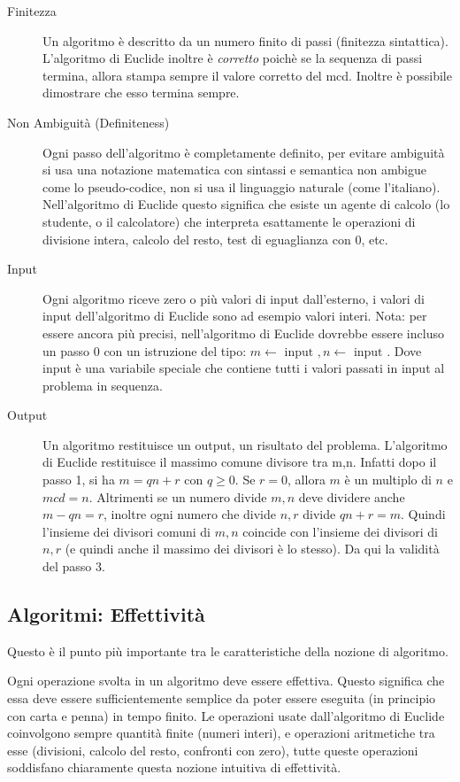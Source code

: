 \begin{description}
\item[Finitezza] Un algoritmo è descritto da un numero finito di passi (finitezza sintattica).  L'algoritmo di Euclide inoltre è \emph{corretto} poichè se la sequenza di passi termina, allora stampa sempre il valore corretto del mcd. Inoltre è possibile dimostrare che esso termina sempre.
\item[Non Ambiguità (Definiteness)] Ogni passo dell'algoritmo è completamente definito, per evitare ambiguità si usa una notazione matematica con sintassi e semantica non ambigue come lo pseudo-codice, non si usa il linguaggio naturale (come l'italiano). Nell'algoritmo di Euclide questo significa che esiste un agente di calcolo (lo studente, o il calcolatore) che interpreta esattamente le operazioni di divisione intera, calcolo del resto, test di eguaglianza con $0$, etc.
\item[Input] Ogni algoritmo riceve zero o più valori di input dall'esterno, i valori di input dell'algoritmo di Euclide sono ad esempio valori interi. Nota: per essere ancora più precisi, nell'algoritmo di Euclide dovrebbe essere incluso un passo $0$ con un istruzione del tipo: $m \leftarrow \mbox{ input }, n \leftarrow \mbox{ input }$. Dove input è una variabile speciale che contiene tutti i valori passati in input al problema in sequenza.
\item[Output] Un algoritmo restituisce un output, un risultato del problema. L'algoritmo di Euclide restituisce il massimo comune divisore tra m,n. Infatti dopo il passo 1, si ha $m = qn+r$ con $q \geq 0$. Se $r = 0$, allora $m$ è un multiplo di $n$ e $mcd = n$. Altrimenti se un numero divide $m,n$ deve dividere anche $m-qn = r$, inoltre ogni numero che divide $n,r$ divide $qn+r=m$. Quindi l'insieme dei divisori comuni di $m, n$ coincide con l'insieme dei divisori di $n, r$ (e quindi anche il massimo dei divisori è lo stesso). Da qui la validità del passo 3.
\end{description}

\subsection{Algoritmi: Effettività}
Questo è il punto più importante tra le caratteristiche della nozione di algoritmo.

Ogni operazione svolta in un algoritmo deve essere effettiva. Questo significa che essa deve essere sufficientemente semplice da poter essere eseguita (in principio con carta e penna) in tempo finito. Le operazioni usate dall'algoritmo di Euclide coinvolgono sempre quantità finite (numeri interi), e operazioni aritmetiche tra esse (divisioni, calcolo del resto, confronti con zero), tutte queste operazioni soddisfano chiaramente questa nozione intuitiva di effettività.

